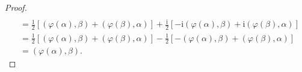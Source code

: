 \documentclass[../../main.tex]{subfiles}%
\begin{document}
\begin{proof}
\begin{align*}
\\
&=\frac{1}{2}\left[ \left( \varphi \left( \alpha \right) ,\beta \right) +\left( \varphi \left( \beta \right) ,\alpha \right) \right] +\frac{\mathrm{i}}{2}\left[ -\mathrm{i}\left( \varphi \left( \alpha \right) ,\beta \right) +\mathrm{i}\left( \varphi \left( \beta \right) ,\alpha \right) \right] 
\\
&=\frac{1}{2}\left[ \left( \varphi \left( \alpha \right) ,\beta \right) +\left( \varphi \left( \beta \right) ,\alpha \right) \right] -\frac{1}{2}\left[ -\left( \varphi \left( \alpha \right) ,\beta \right) +\left( \varphi \left( \beta \right) ,\alpha \right) \right] 
\\
&=\left( \varphi \left( \alpha \right) ,\beta \right) .
\end{align*}
\end{proof}
\end{document}
